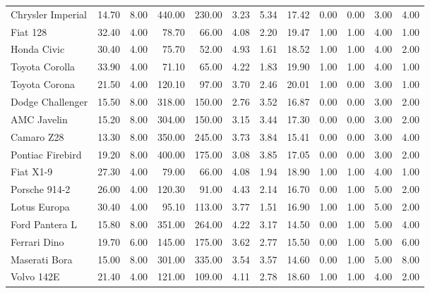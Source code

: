 \documentclass{article}\usepackage[]{graphicx}\usepackage[]{color}
\begin{document}
\begin{table}[ht]
\begin{tabular}{|l|r|r|r|r|r|r|r|r|r|r|r|}
  Chrysler Imperial & 14.70 & 8.00 & 440.00 & 230.00 & 3.23 & 5.34 & 17.42 & 0.00 & 0.00 & 3.00 & 4.00 \\ 
  Fiat 128 & 32.40 & 4.00 & 78.70 & 66.00 & 4.08 & 2.20 & 19.47 & 1.00 & 1.00 & 4.00 & 1.00 \\ 
  Honda Civic & 30.40 & 4.00 & 75.70 & 52.00 & 4.93 & 1.61 & 18.52 & 1.00 & 1.00 & 4.00 & 2.00 \\ 
  Toyota Corolla & 33.90 & 4.00 & 71.10 & 65.00 & 4.22 & 1.83 & 19.90 & 1.00 & 1.00 & 4.00 & 1.00 \\ 
  Toyota Corona & 21.50 & 4.00 & 120.10 & 97.00 & 3.70 & 2.46 & 20.01 & 1.00 & 0.00 & 3.00 & 1.00 \\ 
  Dodge Challenger & 15.50 & 8.00 & 318.00 & 150.00 & 2.76 & 3.52 & 16.87 & 0.00 & 0.00 & 3.00 & 2.00 \\ 
  AMC Javelin & 15.20 & 8.00 & 304.00 & 150.00 & 3.15 & 3.44 & 17.30 & 0.00 & 0.00 & 3.00 & 2.00 \\ 
  Camaro Z28 & 13.30 & 8.00 & 350.00 & 245.00 & 3.73 & 3.84 & 15.41 & 0.00 & 0.00 & 3.00 & 4.00 \\ 
  Pontiac Firebird & 19.20 & 8.00 & 400.00 & 175.00 & 3.08 & 3.85 & 17.05 & 0.00 & 0.00 & 3.00 & 2.00 \\ 
  Fiat X1-9 & 27.30 & 4.00 & 79.00 & 66.00 & 4.08 & 1.94 & 18.90 & 1.00 & 1.00 & 4.00 & 1.00 \\ 
  Porsche 914-2 & 26.00 & 4.00 & 120.30 & 91.00 & 4.43 & 2.14 & 16.70 & 0.00 & 1.00 & 5.00 & 2.00 \\ 
  Lotus Europa & 30.40 & 4.00 & 95.10 & 113.00 & 3.77 & 1.51 & 16.90 & 1.00 & 1.00 & 5.00 & 2.00 \\ 
  Ford Pantera L & 15.80 & 8.00 & 351.00 & 264.00 & 4.22 & 3.17 & 14.50 & 0.00 & 1.00 & 5.00 & 4.00 \\ 
  Ferrari Dino & 19.70 & 6.00 & 145.00 & 175.00 & 3.62 & 2.77 & 15.50 & 0.00 & 1.00 & 5.00 & 6.00 \\ 
  Maserati Bora & 15.00 & 8.00 & 301.00 & 335.00 & 3.54 & 3.57 & 14.60 & 0.00 & 1.00 & 5.00 & 8.00 \\ 
  Volvo 142E & 21.40 & 4.00 & 121.00 & 109.00 & 4.11 & 2.78 & 18.60 & 1.00 & 1.00 & 4.00 & 2.00 \\ 
   \hline
\end{tabular}
\end{table}


\clearpage
\end{document}
